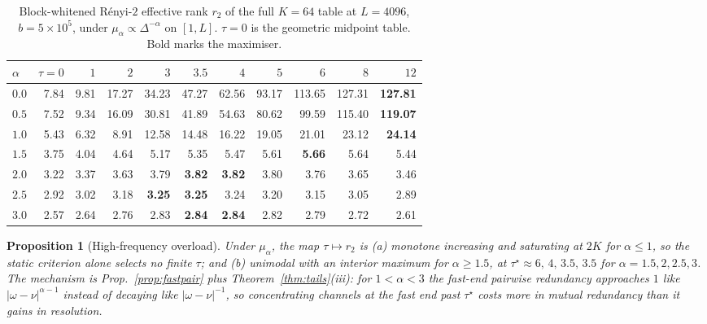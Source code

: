 \documentclass[11pt]{article}
\newtheorem{proposition}[theorem]{Proposition}
\theoremstyle{definition}
\begin{document}
\begin{table}[t]\centering\small
\caption{Block-whitened R\'enyi-$2$ effective rank $r_2$ of the full $K{=}64$ table at $L{=}4096$,
$b{=}5{\times}10^5$, under $\mu_\alpha\propto\Delta^{-\alpha}$ on $[1,L]$. $\tau=0$ is the geometric
midpoint table. Bold marks the maximiser.}
\label{tab:overload}
\begin{tabular}{lrrrrrrrrrr}
\toprule
$\alpha$ & $\tau{=}0$ & $1$ & $2$ & $3$ & $3.5$ & $4$ & $5$ & $6$ & $8$ & $12$\\
\midrule
$0.0$ & 7.84 & 9.81 & 17.27 & 34.23 & 47.27 & 62.56 & 93.17 & 113.65 & 127.31 & \textbf{127.81}\\
$0.5$ & 7.52 & 9.34 & 16.09 & 30.81 & 41.89 & 54.63 & 80.62 & 99.59 & 115.40 & \textbf{119.07}\\
$1.0$ & 5.43 & 6.32 & 8.91 & 12.58 & 14.48 & 16.22 & 19.05 & 21.01 & 23.12 & \textbf{24.14}\\
$1.5$ & 3.75 & 4.04 & 4.64 & 5.17 & 5.35 & 5.47 & 5.61 & \textbf{5.66} & 5.64 & 5.44\\
$2.0$ & 3.22 & 3.37 & 3.63 & 3.79 & \textbf{3.82} & \textbf{3.82} & 3.80 & 3.76 & 3.65 & 3.46\\
$2.5$ & 2.92 & 3.02 & 3.18 & \textbf{3.25} & \textbf{3.25} & 3.24 & 3.20 & 3.15 & 3.05 & 2.89\\
$3.0$ & 2.57 & 2.64 & 2.76 & 2.83 & \textbf{2.84} & \textbf{2.84} & 2.82 & 2.79 & 2.72 & 2.61\\
\bottomrule
\end{tabular}
\end{table}

\begin{proposition}[High-frequency overload]\label{prop:overload}
Under $\mu_\alpha$, the map $\tau\mapsto r_2$ is
\emph{(a)} monotone increasing and saturating at $2K$ for $\alpha\le1$, so the static criterion
alone selects no finite $\tau$; and
\emph{(b)} unimodal with an interior maximum for $\alpha\ge1.5$, at
$\tau^\star\approx6,\,4,\,3.5,\,3.5$ for $\alpha=1.5,2,2.5,3$.
The mechanism is Prop.~\ref{prop:fastpair} plus Theorem~\ref{thm:tails}(iii): for
$1<\alpha<3$ the fast-end pairwise redundancy approaches $1$ like $|\omega-\nu|^{\alpha-1}$
instead of decaying like $|\omega-\nu|^{-1}$, so concentrating channels at the fast end past
$\tau^\star$ costs more in mutual redundancy than it gains in resolution.
\end{proposition}
\end{document}
